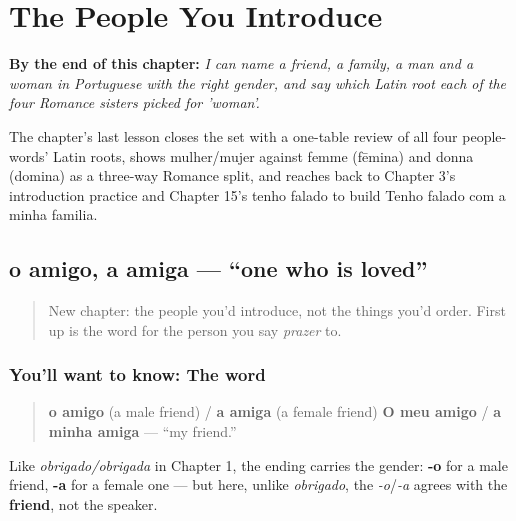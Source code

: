 
\chapter{The People You Introduce}
\label{ch:pt-people-you-introduce}

\begin{chapteropening}
\textbf{By the end of this chapter:} \emph{I can name a friend, a family, a man and a woman in Portuguese with the right gender, and say which Latin root each of the four Romance sisters picked for 'woman'.}

The chapter's last lesson closes the set with a one-table review of all four people-words' Latin roots, shows mulher/mujer against femme (fēmina) and donna (domina) as a three-way Romance split, and reaches back to Chapter 3's introduction practice and Chapter 15's tenho falado to build Tenho falado com a minha familia.
\end{chapteropening}

\section[o amigo, a amiga]{o amigo, a amiga — \textquotedblleft{}one who is loved\textquotedblright{}}

\label{lesson:PT-C25-amigo}



\begin{quote}
New chapter: the people you'd introduce, not the things you'd order. First up is the word for the person you say \emph{prazer} to.
\end{quote}

\subsection*{You'll want to know: The word}
\begin{quote}
\textbf{o amigo} (a male friend) / \textbf{a amiga} (a female friend) \textbf{O meu amigo} / \textbf{a minha amiga} — \textquotedblleft{}my friend.\textquotedblright{}
\end{quote}

Like \emph{obrigado/obrigada} in Chapter 1, the ending carries the gender: \textbf{-o} for a male friend, \textbf{-a} for a female one — but here, unlike \emph{obrigado}, the \emph{-o}/\emph{-a} agrees with the \textbf{friend}, not the speaker.

